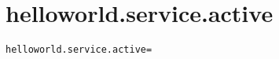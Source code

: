 \section{helloworld.service.active}
\label{configuration:HelloworldServiceActive}
\AvailableInCsharpOnly{\TODO}
\begin{lstlisting}[style=Props,caption={Usage example for \textit{helloworld.service.active}}]
helloworld.service.active=
\end{lstlisting}
